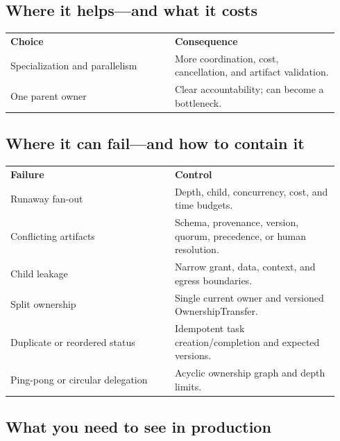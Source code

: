 \subsection{Where it helps—and what it costs}

\BookTableStart
\small
\begin{tabular}{@{}Y{0.4700\linewidth}Y{0.4700\linewidth}@{}}
\color{white}\bfseries \textbf{Choice} & \color{white}\bfseries \textbf{Consequence} \\
Specialization and parallelism & More coordination, cost, cancellation, and artifact validation. \\
One parent owner & Clear accountability; can become a bottleneck. \\
\end{tabular}
\BookTableEnd

\subsection{Where it can fail—and how to contain it}

\BookTableStart
\small
\begin{tabular}{@{}Y{0.4700\linewidth}Y{0.4700\linewidth}@{}}
\color{white}\bfseries \textbf{Failure} & \color{white}\bfseries \textbf{Control} \\
Runaway fan-out & Depth, child, concurrency, cost, and time budgets. \\
Conflicting artifacts & Schema, provenance, version, quorum, precedence, or human resolution. \\
Child leakage & Narrow grant, data, context, and egress boundaries. \\
Split ownership & Single current owner and versioned OwnershipTransfer. \\
Duplicate or reordered status & Idempotent task creation/completion and expected versions. \\
Ping-pong or circular delegation & Acyclic ownership graph and depth limits. \\
\end{tabular}
\BookTableEnd

\subsection{What you need to see in production}

